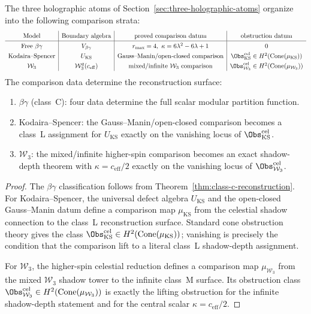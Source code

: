 \begin{theorem}
The three holographic atoms of Section~\ref{sec:three-holographic-atoms} organize into
the following comparison strata:
\[
\renewcommand{\arraystretch}{1.3}
\begin{array}{c|c|c|c}
\text{Model} & \text{Boundary algebra} & \text{proved comparison datum} & \text{obstruction datum} \\
\hline
\text{Free } \beta\gamma
& V_{\beta\gamma}
& r_{\max}=4,\ \kappa=6\lambda^2-6\lambda+1
& 0 \\
\text{Kodaira--Spencer}
& U_{\mathrm{KS}}
& \text{Gauss--Manin/open-closed comparison}
& \Obs^{\mathrm{cel}}_{\mathrm{KS}}\in H^2(\Cone(\mu_{\mathrm{KS}})) \\
\mathcal{W}_3
& \mathcal{W}_3^q(c_{\mathrm{eff}})
& \text{mixed/infinite } \mathcal{W}_3\text{ comparison}
& \Obs^{\mathrm{cel}}_{\mathcal W_3}\in H^2(\Cone(\mu_{\mathcal W_3}))
\end{array}
\]
The comparison data determine the reconstruction surface:
\begin{enumerate}[label=\textup{(\roman*)}]
\item $\beta\gamma$ (class~C): four data determine the full scalar modular partition function.
\item Kodaira--Spencer: the Gauss--Manin/open-closed comparison becomes a class~L
 assignment for $U_{\mathrm{KS}}$ exactly on the vanishing locus of
 $\Obs^{\mathrm{cel}}_{\mathrm{KS}}$.
\item $\mathcal{W}_3$: the mixed/infinite higher-spin comparison becomes an exact
 shadow-depth theorem with $\kappa=c_{\mathrm{eff}}/2$ exactly on the
 vanishing locus of $\Obs^{\mathrm{cel}}_{\mathcal W_3}$.
\end{enumerate}
\end{theorem}

\begin{proof}
The $\beta\gamma$ classification follows from Theorem~\ref{thm:class-c-reconstruction}.
For Kodaira--Spencer, the universal defect algebra $U_{\mathrm{KS}}$
and the open-closed Gauss--Manin datum define a comparison map
$\mu_{\mathrm{KS}}$ from the celestial shadow connection to the class~L
reconstruction surface. Standard cone obstruction theory gives the
class $\Obs^{\mathrm{cel}}_{\mathrm{KS}}\in H^2(\Cone(\mu_{\mathrm{KS}}))$;
vanishing is precisely the condition that the comparison lift to a
literal class~L shadow-depth assignment.

For $\mathcal{W}_3$, the higher-spin celestial reduction defines a
comparison map $\mu_{\mathcal W_3}$ from the mixed $\mathcal W_3$
shadow tower to the infinite class~M surface. Its obstruction class
$\Obs^{\mathrm{cel}}_{\mathcal W_3}\in H^2(\Cone(\mu_{\mathcal W_3}))$
is exactly the lifting obstruction for the infinite shadow-depth
statement and for the central scalar $\kappa=c_{\mathrm{eff}}/2$.
\end{proof}

